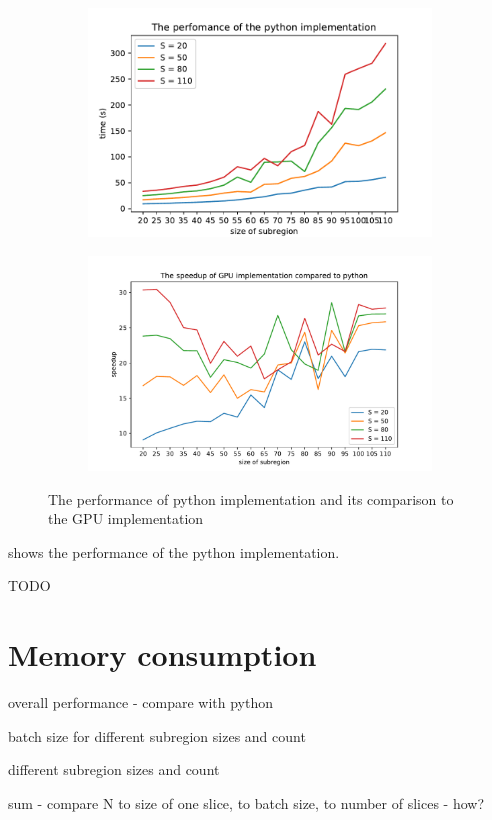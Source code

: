 \begin{figure}
	\centering
	\begin{subfigure}{\textwidth}
		\centering
		\includegraphics[width=0.75\linewidth]{img/eval/python-impl-plot-abs}
		\caption{}
		\label{python-impl-plot-abs}
	\end{subfigure}
	
	\begin{subfigure}{\textwidth}
		\centering
		\includegraphics[width=0.75\linewidth]{img/eval/python-impl-plot-speedup}
		\caption{}
		\label{python-impl-plot-speedup}
	\end{subfigure}
	
	
	\caption{The performance of python implementation and its comparison to the GPU implementation}
	\label{python-impl}
\end{figure}

 shows the performance of the python implementation. 

TODO

\section{Memory consumption}


overall performance - compare with python

batch size for different subregion sizes and count

different subregion sizes and count

sum - compare N to size of one slice, to batch size, to number of slices - how?